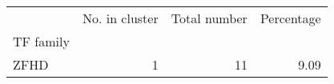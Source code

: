 \begin{tabular}{lrrr}
\toprule
{} &  No. in cluster &  Total number &  Percentage \\
TF family &                 &               &             \\
\midrule
ZFHD      &               1 &            11 &        9.09 \\
\bottomrule
\end{tabular}
